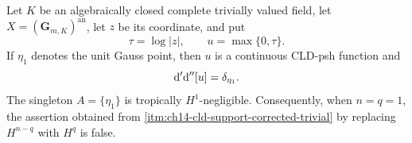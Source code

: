 \begin{proposition}
\label{prop:ch14-cld-support-printed-exponent-counterexample}
Let $K$ be an algebraically closed complete trivially valued field, let
$X=(\mathbf G_{m,K})^{\mathrm{an}}$, let $z$ be its coordinate, and put
\[
               \tau=\log|z|,
               \qquad
               u=\max\{0,\tau\}.
\]
If $\eta_1$ denotes the unit Gauss point, then $u$ is a continuous CLD-psh
function and
\begin{equation}
\label{eq:ch14-cld-support-kink-dirac}
                         \mathrm d'\mathrm d''[u]=\delta_{\eta_1}.
\end{equation}
The singleton $A=\{\eta_1\}$ is tropically $H^1$-negligible.  Consequently,
when $n=q=1$, the assertion obtained from
\cref{itm:ch14-cld-support-corrected-trivial} by replacing $H^{n-q}$ with
$H^q$ is false.
\end{proposition}
